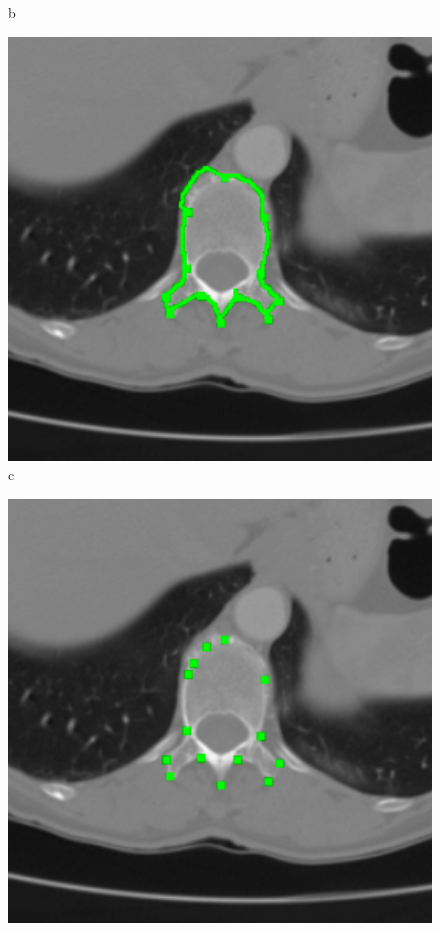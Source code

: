\documentclass[a4paper,11pt,twoside,openright]{report}
\theoremstyle{definition}
\begin{document}
\begin{figure}[h!]
\begin{center}
\begin{center}
		b
	\end{center}
	\endminipage\hfill
	\begin{center}
		\includegraphics[width=1.0\textwidth]{176}
		c
	\end{center}
	\endminipage\hfill
	\begin{center}
		\includegraphics[width=1.0\textwidth]{177}

\end{center}
\end{center}
\end{figure}
\end{document}
